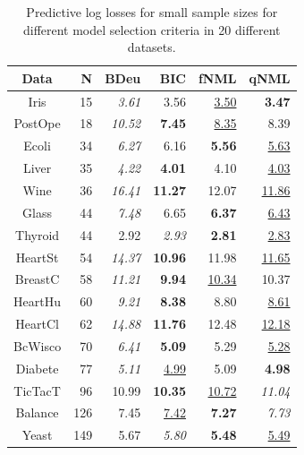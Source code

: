 \begin{table}
\caption{Predictive log losses for small sample sizes for different model selection criteria in 20 different datasets.}
\label{tbl:preds}
\begin{center}
 \begin{tabular}{crrrrr}
    Data &     N &              BDeu &               BIC &               fNML &               qNML \\
\midrule
    Iris &    15 &     \textit{3.61} &              3.56 &   \underline{3.50} &      \textbf{3.47} \\
 PostOpe &    18 &    \textit{10.52} &     \textbf{7.45} &   \underline{8.35} &               8.39 \\
   Ecoli &    34 &     \textit{6.27} &              6.16 &      \textbf{5.56} &   \underline{5.63} \\
   Liver &    35 &     \textit{4.22} &     \textbf{4.01} &               4.10 &   \underline{4.03} \\
    Wine &    36 &    \textit{16.41} &    \textbf{11.27} &              12.07 &  \underline{11.86} \\
   Glass &    44 &     \textit{7.48} &              6.65 &      \textbf{6.37} &   \underline{6.43} \\
 Thyroid &    44 &              2.92 &     \textit{2.93} &      \textbf{2.81} &   \underline{2.83} \\
 HeartSt &    54 &    \textit{14.37} &    \textbf{10.96} &              11.98 &  \underline{11.65} \\
 BreastC &    58 &    \textit{11.21} &     \textbf{9.94} &  \underline{10.34} &              10.37 \\
 HeartHu &    60 &     \textit{9.21} &     \textbf{8.38} &               8.80 &   \underline{8.61} \\
 HeartCl &    62 &    \textit{14.88} &    \textbf{11.76} &              12.48 &  \underline{12.18} \\
 BcWisco &    70 &     \textit{6.41} &     \textbf{5.09} &               5.29 &   \underline{5.28} \\
 Diabete &    77 &     \textit{5.11} &  \underline{4.99} &               5.09 &      \textbf{4.98} \\
 TicTacT &    96 &             10.99 &    \textbf{10.35} &  \underline{10.72} &     \textit{11.04} \\
 Balance &   126 &              7.45 &  \underline{7.42} &      \textbf{7.27} &      \textit{7.73} \\
   Yeast &   149 &              5.67 &     \textit{5.80} &      \textbf{5.48} &   \underline{5.49} \\

\end{tabular}
\end{center}
\end{table}
